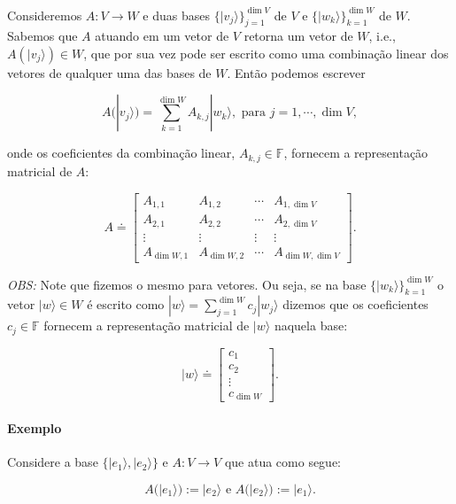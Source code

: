\documentclass[11pt]{article}
\begin{document}
Consideremos \(A:V\rightarrow W\) e duas bases
\(\{|v_{j}\rangle\}_{j=1}^{\dim V}\) de \(V\) e
\(\{|w_{k}\rangle\}_{k=1}^{\dim W}\) de \(W\). Sabemos que \(A\) atuando
em um vetor de \(V\) retorna um vetor de \(W\), i.e.,
\(A(|v_{j}\rangle)\in W\), que por sua vez pode ser escrito como uma
combinação linear dos vetores de qualquer uma das bases de \(W\). Então
podemos escrever

\begin{equation}
A(|v_{j}\rangle) = \sum_{k=1}^{\dim W}A_{k,j}|w_{k}\rangle, \text{ para } j=1,\cdots,\dim V,
\end{equation}

onde os coeficientes da combinação linear, \(A_{k,j}\in\mathbb{F}\),
fornecem a representação matricial de \(A\):

\begin{equation}
A \doteq \begin{bmatrix} A_{1,1} & A_{1,2} & \cdots & A_{1,\dim V} \\ 
A_{2,1} & A_{2,2} & \cdots & A_{2,\dim V} \\ 
\vdots & \vdots & \vdots & \vdots 
\\ A_{\dim W,1} & A_{\dim W,2} & \cdots & A_{\dim W,\dim V} \end{bmatrix}.
\end{equation}

\emph{OBS:} Note que fizemos o mesmo para vetores. Ou seja, se na base
\(\{|w_{k}\rangle\}_{k=1}^{\dim W}\) o vetor \(|w\rangle\in W\) é
escrito como \(|w\rangle=\sum_{j=1}^{\dim W}c_{j}|w_{j}\rangle\) dizemos
que os coeficientes \(c_{j}\in\mathbb{F}\) fornecem a representação
matricial de \(|w\rangle\) naquela base:

\begin{equation}
|w\rangle \doteq \begin{bmatrix} c_{1} \\ c_{2} \\ \vdots \\ c_{\dim W} \end{bmatrix}.
\end{equation}

\paragraph{Exemplo}\label{exemplo}

Considere a base \(\{|e_{1}\rangle,|e_{2}\rangle\}\) e
\(A:V\rightarrow V\) que atua como segue:

\begin{equation}
A(|e_{1}\rangle):=|e_{2}\rangle \text{ e } A(|e_{2}\rangle):=|e_{1}\rangle.
\end{equation}
\end{document}
